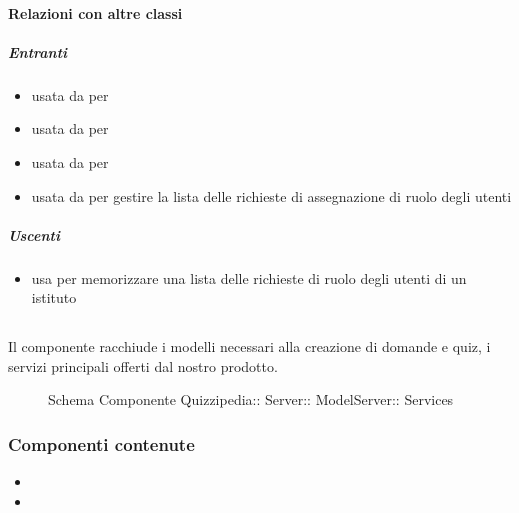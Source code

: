 \paragraph{Relazioni con altre classi}
\subparagraph{Entranti}
\begin{itemize}
\item usata da  per 
\item usata da  per 
\item usata da  per 
\item usata da  per gestire la lista delle richieste di assegnazione di ruolo degli utenti
\end{itemize}
\subparagraph{Uscenti}
\begin{itemize}
\item usa  per memorizzare una lista delle richieste di ruolo degli utenti di un istituto
\end{itemize}
\subsection{}
Il componente racchiude i modelli necessari alla creazione di domande e quiz, i servizi principali offerti dal nostro prodotto.
\begin{figure}[H]
\centering
\noindent{}
\caption[Schema Componente Services]{Schema Componente Quizzipedia:: Server:: ModelServer:: Services}
\end{figure}
\subsubsection{Componenti contenute}
\begin{itemize}
\item {}
\item {}
\end{itemize}
